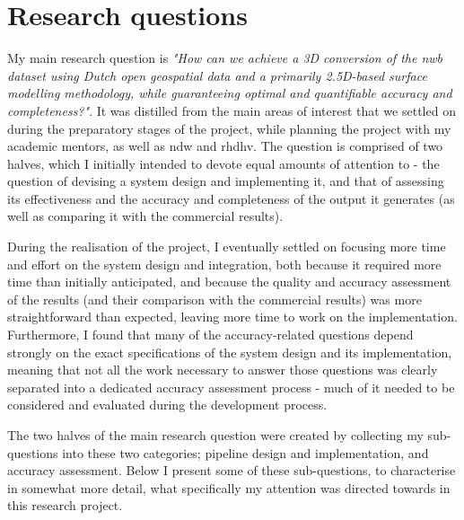 \section{Research questions}
\label{sec:rq}

My main research question is \textit{"How can we achieve a 3D conversion of the \ac{nwb} dataset using Dutch open geospatial data and a primarily 2.5D-based surface modelling methodology, while guaranteeing optimal and quantifiable accuracy and completeness?"}. It was distilled from the main areas of interest that we settled on during the preparatory stages of the project, while planning the project with my academic mentors, as well as \ac{ndw} and \ac{rhdhv}. The question is comprised of two halves, which I initially intended to devote equal amounts of attention to - the question of devising a system design and implementing it, and that of assessing its effectiveness and the accuracy and completeness of the output it generates (as well as comparing it with the commercial results).

During the realisation of the project, I eventually settled on focusing more time and effort on the system design and integration, both because it required more time than initially anticipated, and because the quality and accuracy assessment of the results (and their comparison with the commercial results) was more straightforward than expected, leaving more time to work on the implementation. Furthermore, I found that many of the accuracy-related questions depend strongly on the exact specifications of the system design and its implementation, meaning that not all the work necessary to answer those questions was clearly separated into a dedicated accuracy assessment process - much of it needed to be considered and evaluated during the development process.

The two halves of the main research question were created by collecting my sub-questions into these two categories; pipeline design and implementation, and accuracy assessment. Below I present some of these sub-questions, to characterise in somewhat more detail, what specifically my attention was directed towards in this research project. 

